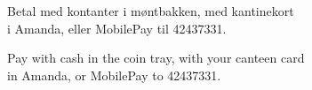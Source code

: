\documentclass{article}
\begin{document}
\vspace{0.5cm}

\begin{center}
\Large\bf

Betal med kontanter i møntbakken, med kantinekort \\ i Amanda, eller MobilePay til 42437331.

{\english Pay with cash in the coin tray, with your canteen card \\ in Amanda,
or MobilePay to 42437331.}

\end{center}

\underskriv
\end{document}
